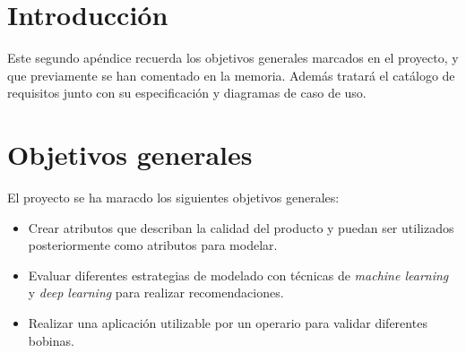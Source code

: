 
\section{Introducción}
Este segundo apéndice recuerda los objetivos generales marcados en el proyecto, y que previamente se han comentado en la memoria. Además tratará el catálogo de requisitos junto con su especificación y diagramas de caso de uso.

\section{Objetivos generales}
El proyecto se ha maracdo los siguientes objetivos generales:
\begin{itemize}
    \item Crear atributos que describan la calidad del producto y puedan ser utilizados posteriormente como atributos para modelar.
    \item Evaluar diferentes estrategias de modelado con técnicas de \emph{machine learning} y \emph{deep learning} para realizar recomendaciones.
    \item Realizar una aplicación utilizable por un operario para validar diferentes bobinas.
\end{itemize}

